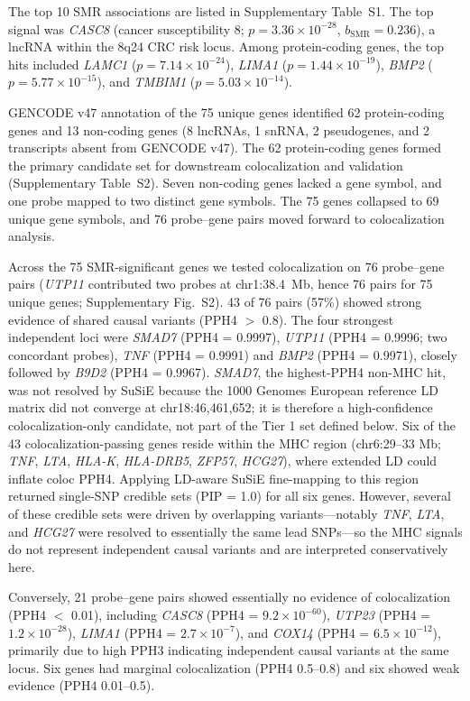 \documentclass[11pt,a4paper]{article}
\begin{document}
The top 10 SMR associations are listed in Supplementary Table~S1. The
top signal was \textit{CASC8} (cancer susceptibility 8; $p =
3.36\times10^{-28}$, $b_{\text{SMR}} = 0.236$), a lncRNA within the
8q24 CRC risk locus. Among protein-coding genes, the top hits included
\textit{LAMC1} ($p = 7.14\times10^{-24}$), \textit{LIMA1} ($p =
1.44\times10^{-19}$), \textit{BMP2} ($p = 5.77\times10^{-15}$), and
\textit{TMBIM1} ($p = 5.03\times10^{-14}$).

GENCODE v47 annotation of the 75 unique genes identified 62 protein-coding
genes and 13 non-coding genes (8 lncRNAs, 1 snRNA, 2 pseudogenes, and 2
transcripts absent from GENCODE v47). The 62 protein-coding genes
formed the primary candidate set for downstream colocalization and
validation (Supplementary Table~S2). Seven non-coding genes lacked a gene
symbol, and one probe mapped to two distinct gene symbols. The 75 genes
collapsed to 69 unique gene symbols, and 76 probe--gene pairs moved
forward to colocalization analysis.

Across the 75 SMR-significant genes we tested colocalization on 76 probe--gene pairs
(\textit{UTP11} contributed two probes at chr1:38.4~Mb, hence 76 pairs for 75 unique
genes; Supplementary Fig.~S2). 43 of 76 pairs (57\%) showed strong evidence of shared causal variants
(PPH4 $>$ 0.8). The four strongest independent loci were \textit{SMAD7} (PPH4 = 0.9997),
\textit{UTP11} (PPH4 = 0.9996; two concordant probes), \textit{TNF} (PPH4 = 0.9991)
and \textit{BMP2} (PPH4 = 0.9971), closely followed by \textit{B9D2} (PPH4 = 0.9967).
\textit{SMAD7}, the highest-PPH4 non-MHC hit, was
not resolved by SuSiE because the 1000 Genomes European reference LD matrix did
not converge at chr18:46,461,652; it is therefore a high-confidence
colocalization-only candidate, not part of the Tier 1 set defined below. Six of
the 43 colocalization-passing genes reside
within the MHC region (chr6:29--33 Mb; \textit{TNF}, \textit{LTA}, \textit{HLA-K},
\textit{HLA-DRB5}, \textit{ZFP57}, \textit{HCG27}), where extended LD could inflate
coloc PPH4. Applying LD-aware SuSiE fine-mapping to this region returned
single-SNP credible sets (PIP = 1.0) for all six genes. However, several of
these credible sets were driven by overlapping variants---notably \textit{TNF},
\textit{LTA}, and \textit{HCG27} were resolved to essentially the same lead SNPs---so
the MHC signals do not represent independent causal variants and are interpreted
conservatively here.

Conversely, 21 probe--gene pairs showed essentially no evidence of colocalization
(PPH4 $<$ 0.01), including \textit{CASC8} (PPH4 = $9.2\times10^{-60}$),
\textit{UTP23} (PPH4 = $1.2\times10^{-28}$), \textit{LIMA1} (PPH4 =
$2.7\times10^{-7}$), and \textit{COX14} (PPH4 = $6.5\times10^{-12}$), primarily
due to high PPH3 indicating independent causal variants at the same locus.
Six genes had marginal colocalization (PPH4 0.5--0.8) and six showed weak
evidence (PPH4 0.01--0.5).
\end{document}
